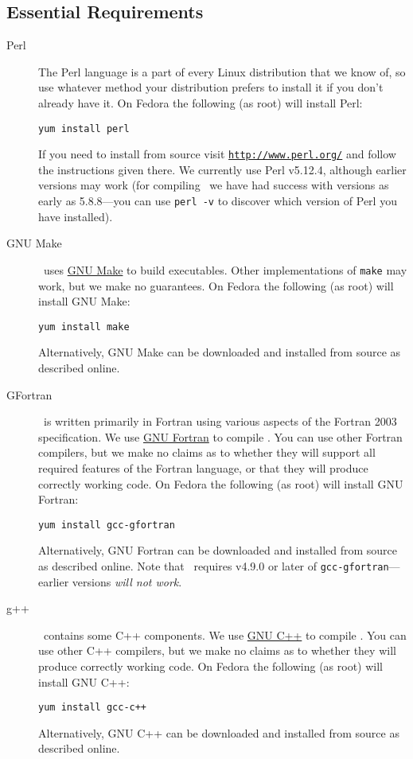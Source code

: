 \subsection{Essential Requirements}\label{sec:requirementsEssential}

\begin{description}
 \item [Perl] The Perl language is a part of every Linux distribution that we know of, so use whatever method your distribution prefers to install it if you don't already have it. On Fedora the following (as root) will install Perl:
\begin{verbatim}
yum install perl
\end{verbatim}
If you need to install from source visit \href{http://www.perl.org/}{\tt http://www.perl.org/} and follow the instructions given there. We currently use Perl v5.12.4, although earlier versions may work (for compiling \glc\ we have had success with versions as early as 5.8.8---you can use {\tt perl -v} to discover which version of Perl you have installed).

\item [GNU Make] \glc\ uses \href{http://www.gnu.org/software/make/}{GNU Make} to build executables. Other implementations of {\tt make} may work, but we make no guarantees. On Fedora the following (as root) will install GNU Make:
\begin{verbatim}
yum install make
\end{verbatim}
Alternatively, GNU Make can be downloaded and installed from source as described online.

\item [GFortran] \glc\ is written primarily in Fortran using various aspects of the Fortran 2003 specification. We use \href{http://gcc.gnu.org/fortran/}{GNU Fortran} to compile \glc. You can use other Fortran compilers, but we make no claims as to whether they will support all required features of the Fortran language, or that they will produce correctly working code. On Fedora the following (as root) will install GNU Fortran:
\begin{verbatim}
yum install gcc-gfortran
\end{verbatim}
Alternatively, GNU Fortran can be downloaded and installed from source as described online. Note that \glc\ requires v4.9.0 or later of {\tt gcc-gfortran}---earlier versions \emph{will not work}.

\item [g++] \glc\ contains some C++ components. We use \href{http://gcc.gnu.org/projects/cxx0x.html}{GNU C++} to compile \glc. You can use other C++ compilers, but we make no claims as to whether they will produce correctly working code. On Fedora the following (as root) will install GNU C++:
\begin{verbatim}
yum install gcc-c++
\end{verbatim}
Alternatively, GNU C++ can be downloaded and installed from source as described online.


\end{description}
